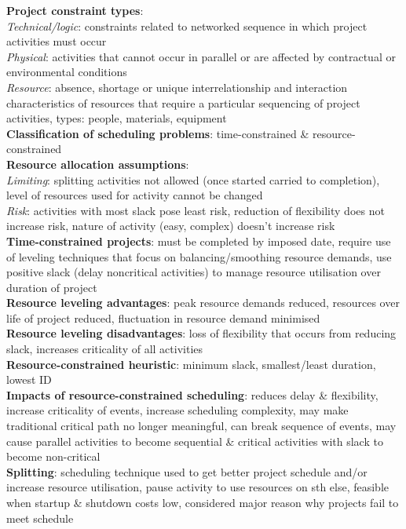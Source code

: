 \documentclass[a4paper]{article}
\begin{document}
\begin{multicols}{3}
        \textbf{Project constraint types}:\\
        \textit{Technical/logic}: constraints related to networked sequence in which project activities must occur\\
        \textit{Physical}: activities that cannot occur in parallel or are affected by contractual or environmental conditions\\
        \textit{Resource}: absence, shortage or unique interrelationship and interaction characteristics of resources that require a particular sequencing of project activities, types: people, materials, equipment\\
        \textbf{Classification of scheduling problems}: time-constrained \& resource-constrained\\
        \textbf{Resource allocation assumptions}:\\
        \textit{Limiting}: splitting activities not allowed (once started carried to completion), level of resources used for activity cannot be changed\\
        \textit{Risk}: activities with most slack pose least risk, reduction of flexibility does not increase risk, nature of activity (easy, complex) doesn't increase risk\\
        \textbf{Time-constrained projects}: must be completed by imposed date, require use of leveling techniques that focus on balancing/smoothing resource demands, use positive slack (delay noncritical activities) to manage resource utilisation over duration of project\\
        \textbf{Resource leveling advantages}: peak resource demands reduced, resources over life of project reduced, fluctuation in resource demand minimised\\
        \textbf{Resource leveling disadvantages}: loss of flexibility that occurs from reducing slack, increases criticality of all activities\\
        \textbf{Resource-constrained heuristic}: minimum slack, smallest/least duration, lowest ID\\
        \textbf{Impacts of resource-constrained scheduling}: reduces delay \& flexibility, increase criticality of events, increase scheduling complexity, may make traditional critical path no longer meaningful, can break sequence of events, may cause parallel activities to become sequential \& critical activities with slack to become non-critical\\
        \textbf{Splitting}: scheduling technique used to get better project schedule and/or increase resource utilisation, pause activity to use resources on sth else, feasible when startup \& shutdown costs low, considered major reason why projects fail to meet schedule\\

\end{multicols}
\end{document}
